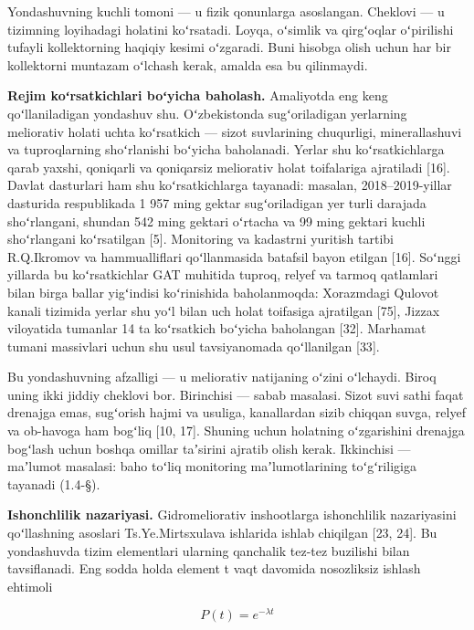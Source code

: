 Yondashuvning kuchli tomoni --- u fizik qonunlarga asoslangan. Cheklovi
--- u tizimning loyihadagi holatini koʻrsatadi. Loyqa, oʻsimlik va
qirgʻoqlar oʻpirilishi tufayli kollektorning haqiqiy kesimi oʻzgaradi.
Buni hisobga olish uchun har bir kollektorni muntazam oʻlchash kerak,
amalda esa bu qilinmaydi.

\textbf{Rejim koʻrsatkichlari boʻyicha baholash.} Amaliyotda eng keng
qoʻllaniladigan yondashuv shu. Oʻzbekistonda sugʻoriladigan yerlarning
meliorativ holati uchta koʻrsatkich --- sizot suvlarining chuqurligi,
minerallashuvi va tuproqlarning shoʻrlanishi boʻyicha baholanadi. Yerlar
shu koʻrsatkichlarga qarab yaxshi, qoniqarli va qoniqarsiz meliorativ
holat toifalariga ajratiladi {[}16{]}. Davlat dasturlari ham shu
koʻrsatkichlarga tayanadi: masalan, 2018--2019-yillar dasturida
respublikada 1 957 ming gektar sugʻoriladigan yer turli darajada
shoʻrlangani, shundan 542 ming gektari oʻrtacha va 99 ming gektari
kuchli shoʻrlangani koʻrsatilgan {[}5{]}. Monitoring va kadastrni
yuritish tartibi R.Q.Ikromov va hammualliflari qoʻllanmasida batafsil
bayon etilgan {[}16{]}. Soʻnggi yillarda bu koʻrsatkichlar GAT muhitida
tuproq, relyef va tarmoq qatlamlari bilan birga ballar yigʻindisi
koʻrinishida baholanmoqda: Xorazmdagi Qulovot kanali tizimida yerlar shu
yoʻl bilan uch holat toifasiga ajratilgan {[}75{]}, Jizzax viloyatida
tumanlar 14 ta koʻrsatkich boʻyicha baholangan {[}32{]}. Marhamat tumani
massivlari uchun shu usul tavsiyanomada qoʻllanilgan {[}33{]}.

Bu yondashuvning afzalligi --- u meliorativ natijaning oʻzini oʻlchaydi.
Biroq uning ikki jiddiy cheklovi bor. Birinchisi --- sabab masalasi.
Sizot suvi sathi faqat drenajga emas, sugʻorish hajmi va usuliga,
kanallardan sizib chiqqan suvga, relyef va ob-havoga ham bogʻliq {[}10,
17{]}. Shuning uchun holatning oʻzgarishini drenajga bogʻlash uchun
boshqa omillar taʼsirini ajratib olish kerak. Ikkinchisi --- maʼlumot
masalasi: baho toʻliq monitoring maʼlumotlarining toʻgʻriligiga tayanadi
(1.4-§).

\textbf{Ishonchlilik nazariyasi.} Gidromeliorativ inshootlarga
ishonchlilik nazariyasini qoʻllashning asoslari Ts.Ye.Mirtsxulava
ishlarida ishlab chiqilgan {[}23, 24{]}. Bu yondashuvda tizim
elementlari ularning qanchalik tez-tez buzilishi bilan tavsiflanadi. Eng
sodda holda element t vaqt davomida nosozliksiz ishlash ehtimoli

\begin{equation}\tag{1.1}
P(t) = e^{-\lambda t}
\end{equation}

